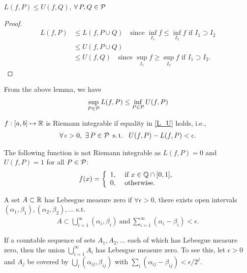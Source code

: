 \documentclass[12pt]{article}
\begin{document}
\begin{Lemma}
$L(f,P)\leq U(f,Q)$, $\forall P,Q \in \calP$
\end{Lemma}
\begin{proof}
\begin{align*}
L(f,P)&\leq L(f,P\cup Q)\quad \text{since $\inf_{I_1} f \leq \inf_{I_2} f$ if $I_1 \supset I_2$}\\
&\leq U(f,P\cup Q)\\
&\leq U(f,Q)\quad \text{since $\sup_{I_1} f \geq \sup_{I_2} f$ if $I_1 \supset I_2$}.
\end{align*}
\end{proof}

From the above lemma, we have
\begin{align}\label{L_U}
\sup_{P\in\mathcal{P}}{L(f,P)}\leq\inf_{P\in\mathcal{P}}{U(f,P)}
\end{align}

\begin{Definition}
$f:[a,b]\mapsto \mathbb{R}$ is Riemann integrable if equality in \cref{L_U} holds, i.e.,
\begin{align*}
\forall \epsilon >0,\ \exists P \in \calP\ \st\ U(f,P)-L(f,P)<\epsilon.
\end{align*}
\end{Definition}

\begin{Example}
The following function is not Riemann integrable as $L(f,P)=0$ and $U(f,P)=1$ for all $P\in\mathcal{P}$:
\begin{align*}
f(x)=\left\{
 \begin{array}{ll}
 1,&\ \text{if $x\in\mathbb{Q}\cap[0,1]$}, \\
 0,&\ \text{otherwise}.  
 \end{array}
\right.
\end{align*}
\end{Example}

\begin{Definition}
A set $A \subset \mathbb{R}$ has Lebesgue measure zero if $\forall\epsilon> 0$, there exists open intervals $(\alpha_1,\beta_1),(\alpha_2,\beta_2),\ldots$ s.t. 
\begin{align*}
A \subset \bigcup_{i=1}^{\infty}(\alpha_i,\beta_i)\ \text{and}\ \sum_{i=1}^{\infty}(\alpha_i-\beta_i)<\epsilon.
\end{align*}
\end{Definition}

If a countable sequence of sets $A_1,A_2,\ldots$ each of which has Lebesgue measure zero, then the union $\bigcup^{\infty}_{i=1}{A_i}$ has Lebesgue measure zero. To see this, let $\epsilon>0$ and $A_j$ be covered by $\bigcup_i{(\alpha_{ij},\beta_{ij})}$ with $\sum_i(\alpha_{ij}-\beta_{ij})<\epsilon/2^j$.
\end{document}
